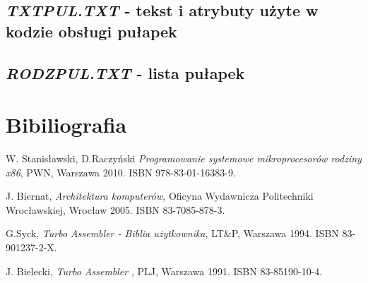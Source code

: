 \documentclass[a4paper,12pt]{article}
\begin{document}
\subsection{\textit{TXTPUL.TXT} - tekst i atrybuty użyte w kodzie obsługi pułapek}


\subsection{\textit{RODZPUL.TXT} - lista pułapek}



	
\section{Bibiliografia}
\begin{thebibliography}{999}
 W. Stanisławski, D.Raczyński 
{\em Programowanie systemowe mikroprocesorów rodziny x86},
PWN, Warszawa 2010. ISBN 978-83-01-16383-9.

 J. Biernat,
{\em Architektura komputerów}, 
Oficyna Wydawnicza Politechniki Wrocławskiej, Wrocław 2005. ISBN 83-7085-878-3.

 G.Syck,
{\em Turbo Assembler - Biblia użytkownika}, 
LT\&P, Warszawa 1994. ISBN 83-901237-2-X.

 J. Bielecki,
{\em Turbo Assembler }, 
PLJ, Warszawa 1991. ISBN 83-85190-10-4.

\end{thebibliography}	
\end{document}

